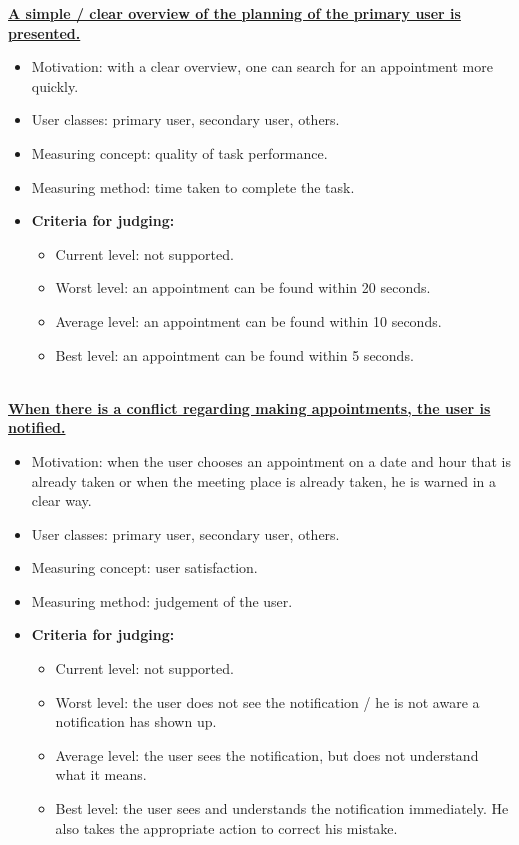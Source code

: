 \documentclass[11pt, a4paper,svglistings]{report}
\begin{document}
\textbf{\underline{A simple / clear overview of the planning of the primary user is presented.}}
\begin{itemize}
\item{Motivation: with a clear overview, one can search for an appointment more quickly.}
\item{User classes: primary user, secondary user, others.}
\item{Measuring concept: quality of task performance.}
\item{Measuring method: time taken to complete the task.}
\item{\textbf{Criteria for judging:}}
\begin{itemize}
\item{Current level: not supported.}
\item{Worst level: an appointment can be found within 20 seconds.}
\item{Average level: an appointment can be found within 10 seconds.}
\item{Best level: an appointment can be found within 5 seconds. \\ \\}
\end{itemize}
\end{itemize}
\textbf{\underline{When there is a conflict regarding making appointments, the user is notified.}}
\begin{itemize}
\item{Motivation: when the user chooses an appointment on a date and hour that is already taken or when the meeting place is already taken, he is warned in a clear way.}
\item{User classes: primary user, secondary user, others.}
\item{Measuring concept: user satisfaction.}
\item{Measuring method: judgement of the user.}
\item{\textbf{Criteria for judging:}}
\begin{itemize}
\item{Current level: not supported.}
\item{Worst level: the user does not see the notification / he is not aware a notification has shown up.}
\item{Average level: the user sees the notification, but does not understand what it means.}
\item{Best level: the user sees and understands the notification immediately. He also takes the appropriate action to correct his mistake. \\ \\}
\end{itemize}
\end{itemize}
\end{document}
